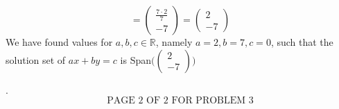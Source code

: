 \documentclass[12pt]{article}
\newenvironment{solution}[1][Solution]
{
	\begin{trivlist} 
		\item[\hskip \labelsep {\itshape #1:}]
	}
	{
	\end{trivlist}
}
\begin{document}
\begin{solution}
\[\]
\[
=\begin{pmatrix} \frac{7 \cdot 2}{7} \\ {-7} \end{pmatrix} = \begin{pmatrix}2 \\ -7 \end{pmatrix}
\]
We have found values for $a,b,c \in \mathbb{R}$, namely $a=2, b=7, c=0$, such that the solution set of $ax+by=c$ is Span$\Bigg(\begin{pmatrix} 2 \\ -7 \end{pmatrix}\Bigg)$
\end{solution}. 
\newline
\newline
\newline
\newline
\newline
\newline
\newline
\newline
\newline
\newline
\newline
\newline
\newline
\newline
\newline
\newline
\[
\text{PAGE 2 OF 2 FOR PROBLEM 3}
\]
\end{document}
